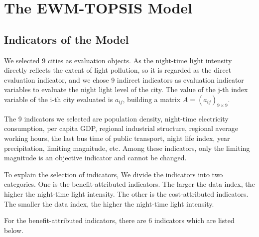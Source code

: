 \section{The EWM-TOPSIS Model}

\subsection{Indicators of the Model}
We selected 9 cities as evaluation objects. As the night-time light intensity directly reflects the extent of light pollution, so it is regarded as the direct evaluation indicator, and we chose 9 indirect indicators as evaluation indicator variables to evaluate the night light level of the city. 
The value of the j-th index variable of the i-th city evaluated is $a_{ij}$, building a matrix $A=(a_{ij})_{9\times9}$.

The 9 indicators we selected are population density, night-time electricity consumption, per capita GDP, regional industrial structure, regional average working hours, the last bus time of public transport, night life index, year precipitation, limiting magnitude, etc. Among these indicators, only the limiting magnitude is an objective indicator and cannot be changed.

To explain the selection of indicators, We divide the indicators into two categories. One is the benefit-attributed indicators. The larger the data index, the higher the night-time light intensity. The other is the cost-attributed indicators. The smaller the data index, the higher the night-time light intensity.

For the benefit-attributed indicators, there are 6 indicators which are listed below.

